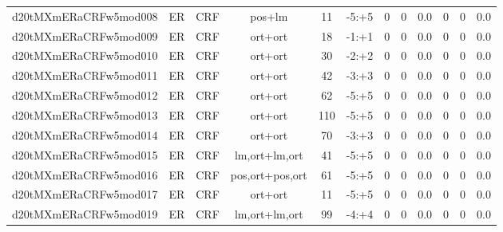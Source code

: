 \documentclass[a4paper]{article}
\begin{document}
\begin{landscape}
\begin{center}
\begin{tabular}{ |c|c|c|c|c|c|c|c|c|c|c|c|}
 
 	
 	\small{ d20tMXmERaCRFw5mod008 } & ER & CRF & pos+lm  &  11 &  -5:+5  &  0 & 0 & 0.0  &  0 & 0 & 0.0 \\
 	

 
 	
 	\small{ d20tMXmERaCRFw5mod009 } & ER & CRF & ort+ort  &  18 &  -1:+1  &  0 & 0 & 0.0  &  0 & 0 & 0.0 \\
 	

 
 	
 	\small{ d20tMXmERaCRFw5mod010 } & ER & CRF & ort+ort  &  30 &  -2:+2  &  0 & 0 & 0.0  &  0 & 0 & 0.0 \\
 	

 
 	
 	\small{ d20tMXmERaCRFw5mod011 } & ER & CRF & ort+ort  &  42 &  -3:+3  &  0 & 0 & 0.0  &  0 & 0 & 0.0 \\
 	

 
 	
 	\small{ d20tMXmERaCRFw5mod012 } & ER & CRF & ort+ort  &  62 &  -5:+5  &  0 & 0 & 0.0  &  0 & 0 & 0.0 \\
 	

 
 	
 	\small{ d20tMXmERaCRFw5mod013 } & ER & CRF & ort+ort  &  110 &  -5:+5  &  0 & 0 & 0.0  &  0 & 0 & 0.0 \\
 	

 
 	
 	\small{ d20tMXmERaCRFw5mod014 } & ER & CRF & ort+ort  &  70 &  -3:+3  &  0 & 0 & 0.0  &  0 & 0 & 0.0 \\
 	

 
 	
 	\small{ d20tMXmERaCRFw5mod015 } & ER & CRF & lm,ort+lm,ort  &  41 &  -5:+5  &  0 & 0 & 0.0  &  0 & 0 & 0.0 \\
 	

 
 	
 	\small{ d20tMXmERaCRFw5mod016 } & ER & CRF & pos,ort+pos,ort  &  61 &  -5:+5  &  0 & 0 & 0.0  &  0 & 0 & 0.0 \\
 	

 
 	
 	\small{ d20tMXmERaCRFw5mod017 } & ER & CRF & ort+ort  &  11 &  -5:+5  &  0 & 0 & 0.0  &  0 & 0 & 0.0 \\
 	

 
 	
 	\small{ d20tMXmERaCRFw5mod019 } & ER & CRF & lm,ort+lm,ort  &  99 &  -4:+4  &  0 & 0 & 0.0  &  0 & 0 & 0.0 \\
 	


\end{tabular}
\end{center}
\end{landscape}
\end{document}
